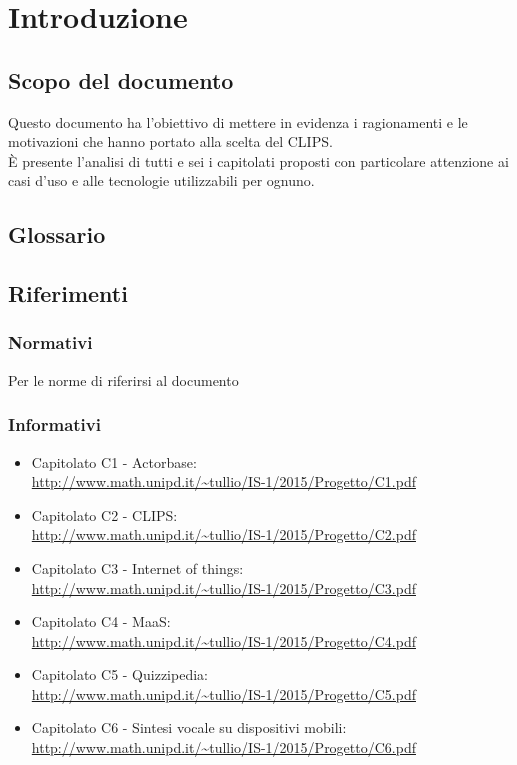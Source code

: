 \section{Introduzione}
\subsection{Scopo del documento}

Questo documento ha l'obiettivo di mettere in evidenza i ragionamenti e le motivazioni che hanno portato alla scelta del  CLIPS.\\
È presente l'analisi di tutti e sei i capitolati proposti con particolare attenzione ai casi d'uso e alle tecnologie utilizzabili per ognuno.

\subsection{Glossario}
\GLOSSARIO

\subsection{Riferimenti}
\subsubsection{Normativi}
Per le norme di  riferirsi al documento \NPdoc
\subsubsection{Informativi}
\begin{itemize}
	\item Capitolato C1 - Actorbase: \\ \url{http://www.math.unipd.it/~tullio/IS-1/2015/Progetto/C1.pdf}
	\item Capitolato C2 - CLIPS: \\ \url{http://www.math.unipd.it/~tullio/IS-1/2015/Progetto/C2.pdf}
	\item Capitolato C3 - Internet of things: \\ \url{http://www.math.unipd.it/~tullio/IS-1/2015/Progetto/C3.pdf}
	\item Capitolato C4 - MaaS: \\ \url{http://www.math.unipd.it/~tullio/IS-1/2015/Progetto/C4.pdf}
	\item Capitolato C5 - Quizzipedia: \\ \url{http://www.math.unipd.it/~tullio/IS-1/2015/Progetto/C5.pdf}
	\item Capitolato C6 - Sintesi vocale su dispositivi mobili: \\ \url{http://www.math.unipd.it/~tullio/IS-1/2015/Progetto/C6.pdf}
\end{itemize}
